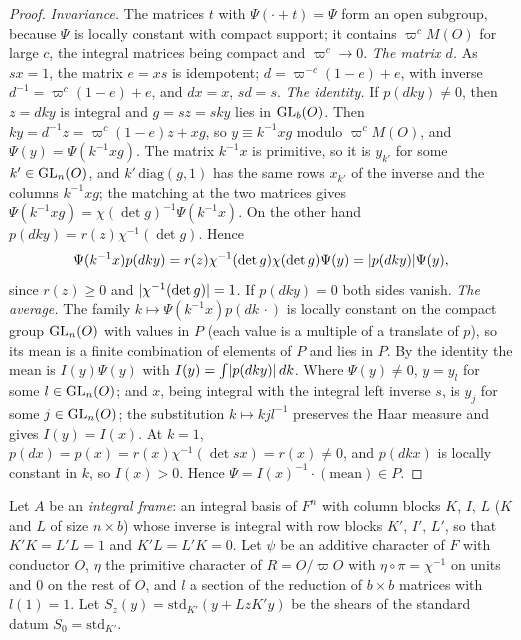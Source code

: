 \begin{proof}
\emph{Invariance.} The matrices $t$ with $\Psi(\cdot+t)=\Psi$ form an open subgroup, because $\Psi$ is locally constant with compact support; it contains $\varpi^cM(O)$ for large $c$, the integral matrices being
compact and $\varpi^c\to0$. \emph{The matrix $d$.} As $sx=1$, the matrix $e=xs$ is idempotent; $d=\varpi^{-c}(1-e)+e$, with inverse $d^{-1}=\varpi^c(1-e)+e$, and $dx=x$, $sd=s$. \emph{The identity.} If
$p(dky)\ne0$, then $z=dky$ is integral and $g=sz=sky$ lies in $\operatorname{GL}_b(O)$. Then $ky=d^{-1}z=\varpi^c(1-e)z+xg$, so $y\equiv k^{-1}xg$ modulo $\varpi^cM(O)$, and $\Psi(y)=\Psi(k^{-1}xg)$. The matrix $k^{-1}x$ is
primitive, so it is $y_{k'}$ for some $k'\in\operatorname{GL}_n(O)$, and $k'\,\mathrm{diag}(g,1)$ has the same rows $x_{k'}$ of the inverse and the columns $k^{-1}xg$; the matching at the two matrices gives
$\Psi(k^{-1}xg)=\chi(\det g)^{-1}\Psi(k^{-1}x)$. On the other hand $p(dky)=r(z)\chi^{-1}(\det g)$. Hence
\[
  \Psi(k^{-1}x)p(dky)=r(z)\chi^{-1}(\det g)\chi(\det g)\Psi(y)=\lvert p(dky)\rvert\Psi(y),
\]
since $r(z)\ge0$ and $\lvert \chi^{-1}(\det g)\rvert=1$. If $p(dky)=0$ both sides vanish. \emph{The average.} The family $k\mapsto\Psi(k^{-1}x)p(dk\,\cdot)$ is locally constant on the compact group $\operatorname{GL}_n(O)$ with
values in $P$ (each value is a multiple of a translate of $p$), so its mean is a finite combination of elements of $P$ and lies in $P$. By the identity the mean is $I(y)\Psi(y)$ with
$I(y)=\int\lvert p(dky)\rvert\,dk$. Where $\Psi(y)\ne0$, $y=y_l$ for some $l\in\operatorname{GL}_n(O)$; and $x$, being integral with the integral left inverse $s$, is $y_j$ for some $j\in\operatorname{GL}_n(O)$; the substitution $k\mapsto kjl^{-1}$
preserves the Haar measure and gives $I(y)=I(x)$. At $k=1$, $p(dx)=p(x)=r(x)\chi^{-1}(\det sx)=r(x)\ne0$, and $p(dk x)$ is locally constant in $k$, so $I(x)>0$. Hence $\Psi=I(x)^{-1}\cdot(\text{mean})\in P$.
\end{proof}

Let $A$ be an \emph{integral frame}: an integral basis of $F^n$ with column blocks $K$, $I$, $L$ ($K$ and $L$ of size $n\times b$) whose inverse is integral with row blocks $K'$, $I'$, $L'$, so that
$K'K=L'L=1$ and $K'L=L'K=0$. Let $\psi$ be an additive character of $F$ with conductor $O$, $\eta$ the primitive character of $R=O/\varpi O$ with $\eta\circ\pi=\chi^{-1}$ on units and $0$ on the rest of $O$, and
$l$ a section of the reduction of $b\times b$ matrices with $l(1)=1$. Let $S_z(y)=\mathrm{std}_{K'}(y+LzK'y)$ be the shears of the standard datum $S_0=\mathrm{std}_{K'}$.

